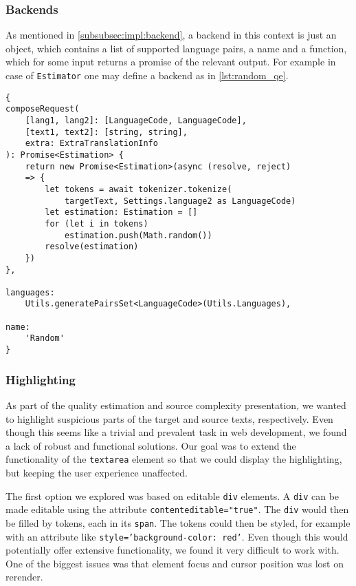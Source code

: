 \subsubsection*{Backends} \label{subsubsec:dev_doc:backend}

As mentioned in \cref{subsubsec:impl:backend}, a backend in this context is just an object, which contains a list of supported language pairs, a name and a function, which for some input returns a promise of the relevant output. For example in case of \texttt{Estimator} one may define a  backend as in \cref{lst:random_qe}.

\begin{lstlisting}[language=none, caption={Random quality estimation backend definition},label={lst:random_qe}]
{
composeRequest(
    [lang1, lang2]: [LanguageCode, LanguageCode],
    [text1, text2]: [string, string],
    extra: ExtraTranslationInfo
): Promise<Estimation> {
    return new Promise<Estimation>(async (resolve, reject)
    => {
        let tokens = await tokenizer.tokenize(
            targetText, Settings.language2 as LanguageCode)
        let estimation: Estimation = []
        for (let i in tokens)
            estimation.push(Math.random())
        resolve(estimation)
    })
},

languages:
    Utils.generatePairsSet<LanguageCode>(Utils.Languages),

name:
    'Random'
}
\end{lstlisting}

\subsubsection{Highlighting} \label{subsubsec:dev_doc:highlighting}

As part of the quality estimation and source complexity presentation, we wanted to highlight suspicious parts of the target and source texts, respectively. Even though this seems like a trivial and prevalent task in web development, we found a lack of robust and functional solutions. Our goal was to extend the functionality of the \texttt{textarea} element so that we could display the highlighting, but keeping the user experience unaffected.

The first option we explored was based on editable \texttt{div} elements. A \texttt{div} can be made editable using the attribute \texttt{contenteditable="true"}. The \texttt{div} would then be filled by tokens, each in its \texttt{span}. The tokens could then be styled, for example with an attribute like \texttt{style='background-color: red'}. Even though this would potentially offer extensive functionality, we found it very difficult to work with. One of the biggest issues was that element focus and cursor position was lost on rerender.

